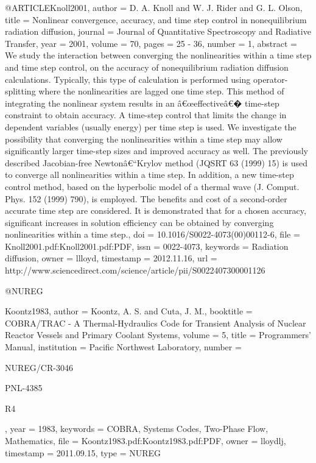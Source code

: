 {@ARTICLE{Knoll2001,
  author = {D. A. Knoll and W. J. Rider and G. L. Olson},
  title = {Nonlinear convergence, accuracy, and time step control in nonequilibrium
	radiation diffusion},
  journal = {Journal of Quantitative Spectroscopy and Radiative Transfer},
  year = {2001},
  volume = {70},
  pages = {25 - 36},
  number = {1},
  abstract = {We study the interaction between converging the nonlinearities within
	a time step and time step control, on the accuracy of nonequilibrium
	radiation diffusion calculations. Typically, this type of calculation
	is performed using operator-splitting where the nonlinearities are
	lagged one time step. This method of integrating the nonlinear system
	results in an â€œeffectiveâ€� time-step constraint to obtain accuracy.
	A time-step control that limits the change in dependent variables
	(usually energy) per time step is used. We investigate the possibility
	that converging the nonlinearities within a time step may allow significantly
	larger time-step sizes and improved accuracy as well. The previously
	described Jacobian-free Newtonâ€“Krylov method (JQSRT 63 (1999) 15)
	is used to converge all nonlinearities within a time step. In addition,
	a new time-step control method, based on the hyperbolic model of
	a thermal wave (J. Comput. Phys. 152 (1999) 790), is employed. The
	benefits and cost of a second-order accurate time step are considered.
	It is demonstrated that for a chosen accuracy, significant increases
	in solution efficiency can be obtained by converging nonlinearities
	within a time step.},
  doi = {10.1016/S0022-4073(00)00112-6},
  file = {Knoll2001.pdf:Knoll2001.pdf:PDF},
  issn = {0022-4073},
  keywords = {Radiation diffusion},
  owner = {llloyd},
  timestamp = {2012.11.16},
  url = {http://www.sciencedirect.com/science/article/pii/S0022407300001126}
}

@NUREG{Koontz1983,
  author = {Koontz, A. S. and Cuta, J. M.},
  booktitle = {COBRA/TRAC - A Thermal-Hydraulics Code for Transient Analysis of
	Nuclear Reactor Vessels and Primary Coolant Systems},
  volume = {5},
  title = {Programmers' Manual},
  institution = {Pacific Northwest Laboratory},
  number = {NUREG/CR-3046
	
	PNL-4385
	
	R4},
  year = {1983},
  keywords = {COBRA, Systems Codes, Two-Phase Flow, Mathematics},
  file = {Koontz1983.pdf:Koontz1983.pdf:PDF},
  owner = {lloydlj},
  timestamp = {2011.09.15},
  type = {NUREG}
}

}
